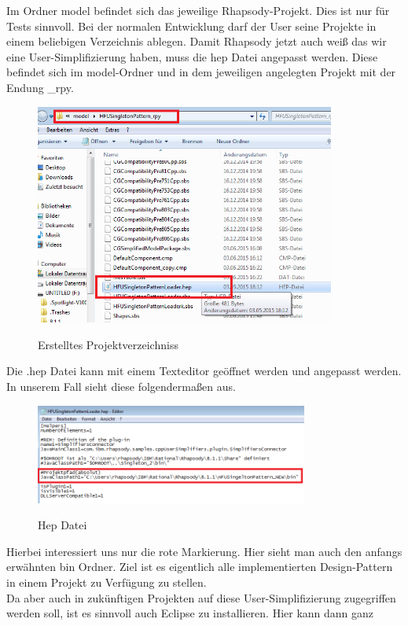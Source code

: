 Im Ordner model befindet sich das jeweilige Rhapsody-Projekt. Dies ist nur für
Tests sinnvoll. Bei der normalen Entwicklung darf der User seine Projekte in
einem beliebigen Verzeichnis ablegen. Damit Rhapsody jetzt auch weiß das wir
eine User-Simplifizierung haben, muss die hep Datei angepasst werden. Diese befindet sich im model-Ordner und in dem jeweiligen angelegten
Projekt mit der Endung _rpy.
\begin{figure}[H]
	\centering
	\includegraphics[width=0.88\textwidth]{content/pictures/install/model.png}
	\label{pic:bild}
	\caption{Erstelltes Projektverzeichniss}
\end{figure}
Die .hep Datei kann mit einem Texteditor geöffnet werden und angepasst werden.
In unserem Fall sieht diese folgendermaßen aus.
\begin{figure}[H]
	\centering
	\includegraphics[width=0.8\textwidth]{content/pictures/install/hep.png}
	\label{pic:bild}
	\caption{Hep Datei}
\end{figure}
Hierbei interessiert uns nur die rote Markierung. Hier sieht man auch den
anfangs erwähnten bin Ordner. Ziel ist es eigentlich alle implementierten
Design-Pattern in einem Projekt zu Verfügung zu stellen.\\
Da aber auch in zukünftigen Projekten auf diese User-Simplifizierung zugegriffen
werden soll, ist es sinnvoll auch Eclipse zu installieren. Hier kann dann ganz
